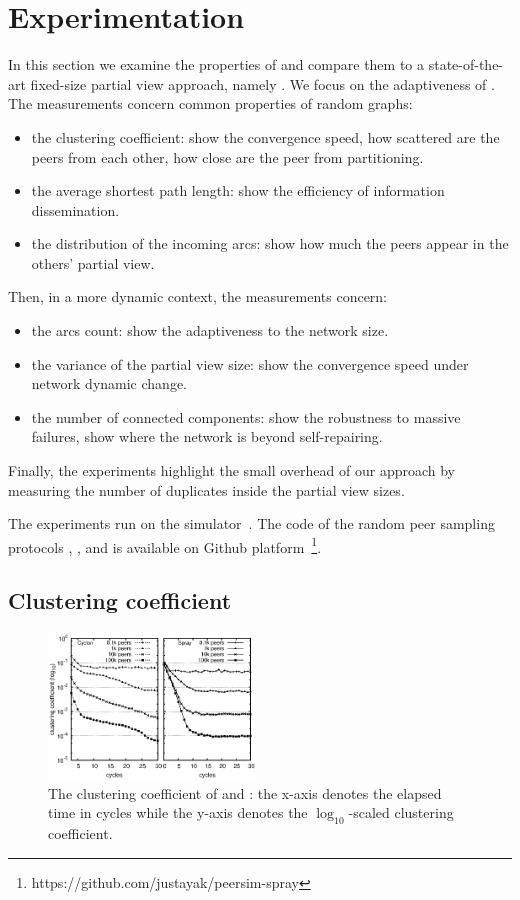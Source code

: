 \section{Experimentation}
\label{sec:experiments}

In this section we examine the properties of \SPRAY and compare them to a
state-of-the-art fixed-size partial view approach, namely \CYCLON. We focus
on the adaptiveness of \SPRAY. The measurements concern common properties of
random graphs:
\begin{itemize}
\item the clustering coefficient: show the convergence speed, how scattered
  are the peers from each other, how close are the peer from partitioning.
\item the average shortest path length: show the efficiency of information
  dissemination.
\item the distribution of the incoming arcs: show how much the peers appear
  in the others' partial view.
\end{itemize}
Then, in a more dynamic context, the measurements concern:
\begin{itemize}
\item the arcs count: show the adaptiveness to the network size.
\item the variance of the partial view size: show the convergence speed under
  network dynamic change.
\item the number of connected components: show the robustness to massive
  failures, show where the network is beyond self-repairing.
\end{itemize}
Finally, the experiments highlight the small overhead of our approach by
measuring the number of duplicates inside the partial view sizes.

The experiments run on the \PEERSIM
simulator~\cite{montresor2009peersim}. The code of the random peer sampling
protocols \CYCLON, \SCAMP, and \SPRAY is available on Github
platform~\footnote{https://github.com/justayak/peersim-spray}.

\subsection{Clustering coefficient}
\label{subsec:cluster}

\begin{figure}
  \centering
  \includegraphics[width=0.49\textwidth]{img/cluster.eps}
  \caption{\label{fig:clustering}The clustering coefficient of \CYCLON and
    \SPRAY: the x-axis denotes the elapsed time in cycles while the y-axis
    denotes the $\log_{10}$-scaled clustering coefficient.}
\end{figure}

